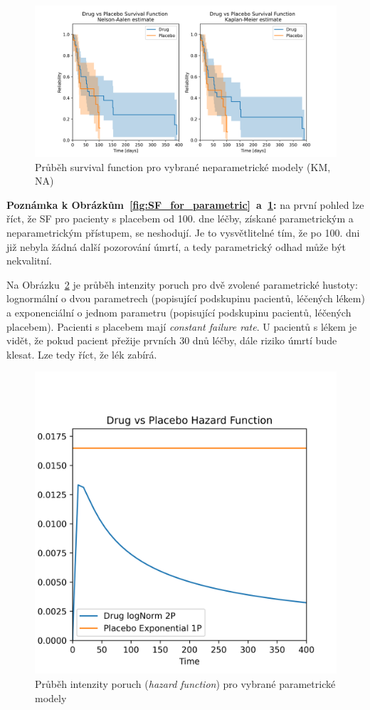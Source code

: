 \documentclass[a4, 11pt]{article}
\theoremstyle{definition}
\theoremstyle{remark}
\begin{document}
   	\begin{figure}[H]
        \centering
        \includegraphics[width=0.9\linewidth]{img/survival_function_drug_vs_placebo_NON_parametric.png}
        \caption{Průběh survival function pro vybrané neparametrické modely (KM, NA)}
        \label{fig:SF_for_nonparametric}
    \end{figure}    
    
    \textbf{Poznámka k Obrázkům~\ref{fig:SF_for_parametric}~a~\ref{fig:SF_for_nonparametric}:} na první pohled lze říct, že SF pro pacienty s placebem od 100. dne léčby, získané parametrickým a neparametrickým přístupem, se neshodují. Je to vysvětlitelné tím, že po 100. dni již nebyla žádná další pozorování úmrtí, a tedy parametrický odhad může být nekvalitní.
    
    Na Obrázku~\ref{fig:HF_for_parametric} je průběh intenzity poruch pro dvě zvolené parametrické hustoty: lognormální o dvou parametrech (popisující podskupinu pacientů, léčených lékem) a exponenciální o jednom parametru (popisující podskupinu pacientů, léčených placebem).
    Pacienti s placebem mají \textit{constant failure rate}. U pacientů s lékem je vidět, že pokud pacient přežije prvních 30 dnů léčby, dále riziko úmrtí bude klesat. Lze tedy říct, že lék zabírá.
    
   	\begin{figure}[H]
        \centering
        \includegraphics[width=0.5\linewidth]{img/hazard_rate_drug_vs_placebo_parametric_my_choice.png}
        \caption{Průběh intenzity poruch (\textit{hazard function}) pro vybrané parametrické modely}
        \label{fig:HF_for_parametric}
    \end{figure} 
    
\end{document}
